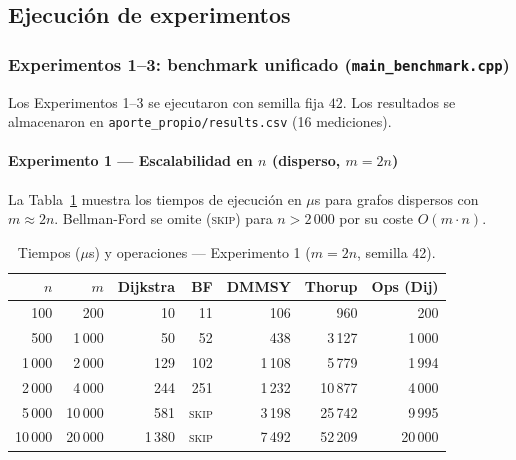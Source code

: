 
\subsection{Ejecución de experimentos}

\subsubsection*{Experimentos 1–3: benchmark unificado (\texttt{main\_benchmark.cpp})}

Los Experimentos 1–3 se ejecutaron con semilla fija $42$. Los resultados se
almacenaron en \texttt{aporte\_propio/results.csv} (16 mediciones).

\paragraph{Experimento 1 — Escalabilidad en $n$ (disperso, $m=2n$)}

La Tabla~\ref{tab:exp1} muestra los tiempos de ejecución en $\mu$s para
grafos dispersos con $m \approx 2n$.
Bellman-Ford se omite (\textsc{skip}) para $n > 2\,000$ por su coste
$O(m\cdot n)$.

\begin{table}[t]
  \centering
  \caption{Tiempos ($\mu$s) y operaciones — Experimento 1 ($m=2n$, semilla 42).}
  \label{tab:exp1}
  \small
  \begin{tabular}{rrrrrrr}
    \toprule
    \textbf{$n$} & \textbf{$m$} &
    \textbf{Dijkstra} & \textbf{BF} &
    \textbf{DMMSY} & \textbf{Thorup} &
    \textbf{Ops (Dij)} \\
    \midrule
    100    & 200     & 10    & 11   & 106   & 960    & 200   \\
    500    & 1\,000  & 50    & 52   & 438   & 3\,127 & 1\,000 \\
    1\,000 & 2\,000  & 129   & 102  & 1\,108 & 5\,779 & 1\,994 \\
    2\,000 & 4\,000  & 244   & 251  & 1\,232 & 10\,877 & 4\,000 \\
    5\,000 & 10\,000 & 581   & \textsc{skip} & 3\,198 & 25\,742 & 9\,995 \\
    10\,000 & 20\,000 & 1\,380 & \textsc{skip} & 7\,492 & 52\,209 & 20\,000 \\
    \bottomrule
  \end{tabular}
\end{table}

